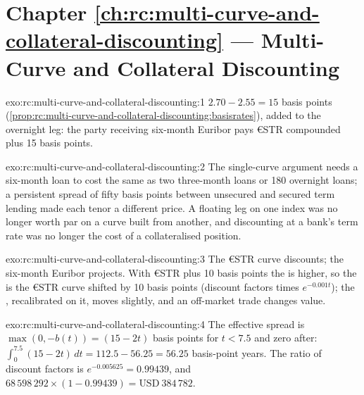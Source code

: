\section*{Chapter \ref{ch:rc:multi-curve-and-collateral-discounting} --- Multi-Curve and Collateral Discounting}

\begin{solution}{exo:rc:multi-curve-and-collateral-discounting:1}
$2.70-2.55 = 15$ basis points
(\cref{prop:rc:multi-curve-and-collateral-discounting:basisrates}), added to the
overnight leg: the party receiving six-month Euribor pays €STR compounded plus
15 basis points.
\end{solution}

\begin{solution}{exo:rc:multi-curve-and-collateral-discounting:2}
The single-curve argument needs a six-month loan to cost the same as two
three-month loans or 180 overnight loans; a persistent spread of fifty
basis points between unsecured and secured term lending made each tenor a
different price. A floating leg on one index was no longer worth par on a curve
built from another, and discounting at a bank's term rate was no longer the
cost of a collateralised position.
\end{solution}

\begin{solution}{exo:rc:multi-curve-and-collateral-discounting:3}
The €STR curve discounts; the six-month Euribor  projects. With
€STR plus 10 basis points the  is higher, so the 
is the €STR curve shifted by 10 basis points (discount factors times
$e^{-0.001t}$); the , recalibrated on it, moves slightly, and
an off-market trade changes value.
\end{solution}

\begin{solution}{exo:rc:multi-curve-and-collateral-discounting:4}
The effective spread is $\max(0,-b(t)) = (15-2t)$ basis points for $t<7.5$
and zero after: $\int_0^{7.5}(15-2t)\,dt = 112.5-56.25 = 56.25$ basis-point
years. The ratio of discount factors is $e^{-0.005625}=0.99439$, and
$68\,598\,292\times(1-0.99439) = \text{USD}~384\,782$.
\end{solution}

